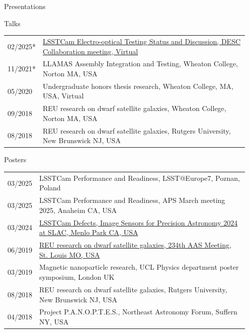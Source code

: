 \documentclass{resume} %
\begin{document}
\begin{rSection}{Presentations}
\begin{rSubsection}{Talks}{}{}{}
\begin{table}[h]
\begin{tabular}{p{0.07\linewidth} p{0.88\linewidth}}
02/2025* & \href{https://docs.google.com/presentation/d/12EPsuWSixo40_oqrDPNaXstYnqDzhI_2aFL2hd7IwTE/edit#slide=id.g2ade3bc380_0_0}{LSSTCam Electro-optical Testing Status and Discussion, DESC Collaboration meeting, Virtual}\\
11/2021* & LLAMAS Assembly Integration and Testing, Wheaton College, Norton MA, USA\\
05/2020 & Undergraduate honors thesis research, Wheaton College, MA, USA, Virtual\\ 
09/2018 & REU research on dwarf satellite galaxies, Wheaton College, Norton MA, USA\\
08/2018 & REU research on dwarf satellite galaxies, Rutgers University, New Brunswick NJ, USA\\
\end{tabular}
\end{table}
\end{rSubsection}

\begin{rSubsection}{Posters}{}{}{}
\begin{table}[h]
\setlength{\extrarowheight}{3pt} 
\begin{tabular}{p{0.07\linewidth} p{0.88\linewidth}}
03/2025 & LSSTCam Performance and Readiness, LSST@Europe7, Poznan, Poland\\
03/2025 & LSSTCam Performance and Readiness, APS March meeting 2025, Anaheim CA, USA\\
03/2024 & \href{https://indico.slac.stanford.edu/event/8442/contributions/8626/}{LSSTCam Defects, Image Sensors for Precision Astronomy 2024 at SLAC, Menlo Park CA, USA}\\
06/2019 & \href{https://assets.pubpub.org/d14kkapv/41575915658488.pdf}{REU research on dwarf satellite galaxies, 234th AAS Meeting, St. Louis MO, USA}\\
03/2019 & Magnetic nanoparticle research, UCL Physics department poster symposium, London UK\\
08/2018 & REU research on dwarf satellite galaxies, Rutgers University, New Brunswick NJ, USA\\
04/2018 & Project P.A.N.O.P.T.E.S., Northeast Astronomy Forum, Suffern NY, USA\\
\end{tabular}
\end{table}
\end{rSubsection}

\end{rSection}
\end{document}

